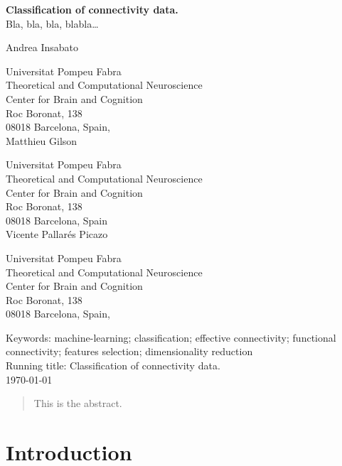 \documentclass[12pt, a4paper, final, fleqn]{article}
\begin{document}
\begin{center}

\vspace*{2cm}

{ \Large {\bf Classification of connectivity data.} \\
Bla, bla, bla, blabla\dots}


\vspace*{2cm}

\large
Andrea Insabato

\normalsize
{Universitat Pompeu Fabra \\
Theoretical and Computational Neuroscience\\
Center for Brain and Cognition \\
Roc Boronat, 138\\
08018 Barcelona, Spain,} \\[1 cm]

\large
Matthieu Gilson

\normalsize
{Universitat Pompeu Fabra \\
Theoretical and Computational Neuroscience\\
Center for Brain and Cognition \\
Roc Boronat, 138\\
08018 Barcelona, Spain} \\[1 cm]

\large
Vicente Pallar\'es Picazo

\normalsize
{Universitat Pompeu Fabra \\
Theoretical and Computational Neuroscience\\
Center for Brain and Cognition \\
Roc Boronat, 138\\
08018 Barcelona, Spain,} 

\end{center}

Keywords:  machine-learning; classification; effective connectivity; functional connectivity; features selection; dimensionality reduction\\
Running title: Classification of connectivity data.\\
\today

\newpage
\doublespacing
\begin{abstract}
This is the abstract.
\end{abstract}

\newpage
\tableofcontents
\newpage
\section{Introduction}
\label{intro}
\end{document}
